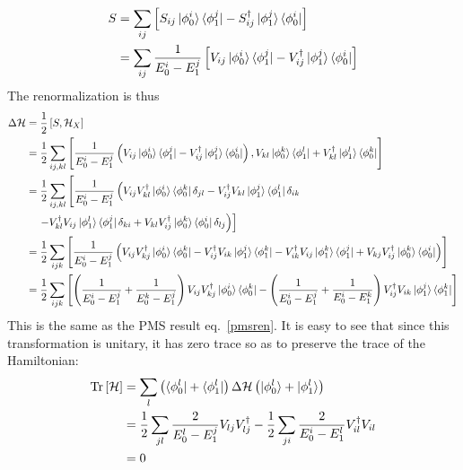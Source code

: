 \documentclass[twoside]{report}
\numberwithin{equation}{section}
\begin{document}
\begin{equation}\begin{aligned}
	\label{swtgen}
	S &= \sum_{ij}\left[S_{ij}\ket{\phi_0^i}\bra{\phi_1^j} - S_{ij}^\dagger\ket{\phi_1^j}\bra{\phi_0^i}\right]\\
	  &= \sum_{ij}\frac{1}{E_0^i - E_1^j}\left[V_{ij}\ket{\phi_0^i}\bra{\phi_1^j} - V^\dagger_{ij}\ket{\phi_1^j}\bra{\phi_0^i}\right]\\
\end{aligned}\end{equation}
The renormalization is thus
\begin{equation}\begin{aligned}
	\Delta \mathcal{H} &= \frac{1}{2} \left[S,\mathcal{H}_X\right]\\
			   &= \frac{1}{2} \sum_{ij,kl}\left[\frac{1}{E_0^i - E_1^j}\left(V_{ij}\ket{\phi_0^i}\bra{\phi_1^j} - V^\dagger_{ij}\ket{\phi_1^j}\bra{\phi_0^i}\right), V_{kl} \ket{\phi_0^k}\bra{\phi_1^l}+ V^\dagger_{kl} \ket{\phi_1^l}\bra{\phi_0^k}\right]\\
                  &= \frac{1}{2} \sum_{ij,kl}\left[\frac{1}{E_0^i - E_1^j}\left(V_{ij}V^\dagger_{kl}\ket{\phi_0^i}\bra{\phi_0^k}\delta_{jl} - V^\dagger_{ij}V_{kl}\ket{\phi_1^j}\bra{\phi_1^l}\delta_{ik}\right.\right.\\
                  &\quad\left.\left.- V^\dagger_{kl}V_{ij}\ket{\phi_1^l}\bra{\phi_1^j}\delta_{ki} + V_{kl}V^\dagger_{ij}\ket{\phi_0^k}\bra{\phi_0^i}\delta_{lj}\right)\right]\\
                  &= \frac{1}{2} \sum_{ijk}\left[\frac{1}{E_0^i - E_1^j}\left(V_{ij}V^\dagger_{kj}\ket{\phi_0^i}\bra{\phi_0^k} - V^\dagger_{ij}V_{ik}\ket{\phi_1^j}\bra{\phi_1^k}- V^\dagger_{ik}V_{ij}\ket{\phi_1^k}\bra{\phi_1^j} + V_{kj}V^\dagger_{ij}\ket{\phi_0^k}\bra{\phi_0^i}\right)\right]\\
		  &= \frac{1}{2} \sum_{ijk}\left[\left(\frac{1}{E_0^i - E_1^j} + \frac{1}{E_0^k - E_1^j}\right)V_{ij}V^\dagger_{kj}\ket{\phi_0^i}\bra{\phi_0^k} - \left(\frac{1}{E_0^i - E_1^j} + \frac{1}{E_0^i - E_1^k}\right)V^\dagger_{ij}V_{ik}\ket{\phi_1^j}\bra{\phi_1^k}\right]\\
\end{aligned}\end{equation}
This is the same as the PMS result eq.~\ref{pmsren}. It is easy to see that since this transformation is unitary, it has zero trace so as to preserve the trace of the Hamiltonian:
\begin{equation}\begin{aligned}
	\text{Tr}\left[\mathcal{H}\right] &= \sum_{l}\left(\bra{\phi_0^l} + \bra{\phi_1^l}\right)\Delta \mathcal{H}\left(\ket{\phi_0^l} + \ket{\phi_1^l}\right)\\
		&= \frac{1}{2} \sum_{jl}\frac{2}{E_0^l - E_1^j}V_{lj}V^\dagger_{lj} - \frac{1}{2} \sum_{ji}\frac{2}{E_0^i - E_1^l}V^\dagger_{il}V_{il}\\
		&= 0
\end{aligned}\end{equation}
\end{document}
